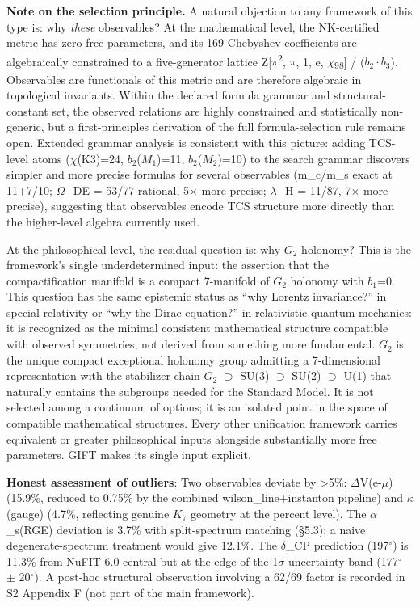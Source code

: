 \documentclass[11pt,a4paper]{article}
\begin{document}
\textbf{Note on the selection principle.} A natural objection to any
framework of this type is: why \emph{these} observables? At the mathematical level, the NK-certified metric has zero free parameters, and its 169 Chebyshev
coefficients are algebraically constrained to a five-generator lattice
Z{[}\(\pi\)\textsuperscript{2}, \(\pi\), 1, e,
\(\chi\)\textsubscript{9}\textsubscript{8}{]} / (\(b_{2} \cdot b_{3}\)).
Observables are functionals of this metric and are therefore algebraic in topological invariants. Within the declared formula grammar and structural-constant set, the observed relations are highly constrained and statistically non-generic, but a first-principles derivation of the full formula-selection rule remains open. Extended grammar analysis is consistent with this picture: adding TCS-level atoms (\(\chi\)(K3)=24,
\(b_{2}\)(\(M_{1}\))=11, \(b_{2}\)(\(M_{2}\))=10) to the search grammar
discovers simpler and more precise formulas for several observables
(m\_c/m\_s exact at 11+7/10; \(\Omega\)\_DE = 53/77 rational,
5\(\times\) more precise; \(\lambda\)\_H = 11/87, 7\(\times\) more
precise), suggesting that observables encode TCS structure more directly than the higher-level algebra currently used.

At the philosophical level, the residual question is: why \(G_{2}\)
holonomy? This is the framework's single underdetermined input: the
assertion that the compactification manifold is a compact 7-manifold of
\(G_{2}\) holonomy with \(b_{1}\)=0. This question has the same
epistemic status as ``why Lorentz invariance?'' in special relativity or
``why the Dirac equation?'' in relativistic quantum mechanics: it is
recognized as the minimal consistent mathematical structure compatible
with observed symmetries, not derived from something more fundamental.
\(G_{2}\) is the unique compact exceptional holonomy group admitting a
7-dimensional representation with the stabilizer chain \(G_{2}\)
\(\supset\) SU(3) \(\supset\) SU(2) \(\supset\) U(1) that naturally
contains the subgroups needed for the Standard Model. It is not selected
among a continuum of options; it is an isolated point in the space of
compatible mathematical structures. Every other unification framework
carries equivalent or greater philosophical inputs alongside
substantially more free parameters. GIFT makes its single input
explicit.

\textbf{Honest assessment of outliers}: Two observables deviate by
\textgreater5\%: \(\Delta\)V(e-\(\mu\)) (15.9\%, reduced to 0.75\% by
the combined wilson\_line+instanton pipeline) and \(\kappa\)(gauge)
(4.7\%, reflecting genuine \(K_{7}\) geometry at the percent level). The
\(\alpha\)\_s(RGE) deviation is 3.7\% with split-spectrum matching
(§5.3); a naive degenerate-spectrum treatment would give 12.1\%. The
\(\delta\)\_CP prediction (197\({}^{\circ}\)) is 11.3\% from NuFIT 6.0
central but at the edge of the 1\(\sigma\) uncertainty band
(177\({}^{\circ}\) \(\pm\) 20\({}^{\circ}\)). A post-hoc structural observation involving a 62/69 factor is recorded in S2 Appendix F (not part of the main framework).
\end{document}
